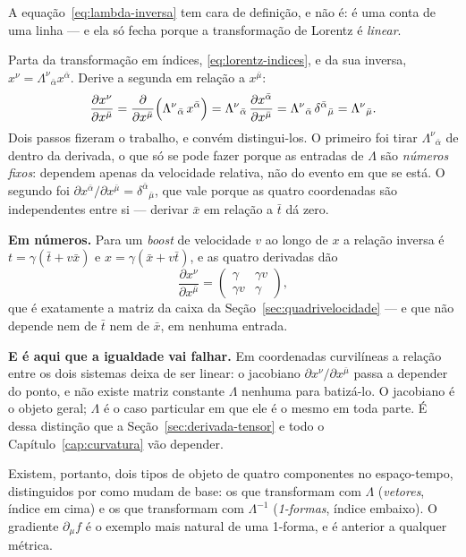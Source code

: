 \documentclass[12pt,a4paper,oneside]{book}
\theoremstyle{rgplain}
\theoremstyle{rgremark}
\begin{document}
\begin{resultado}[title={\sffamily\bfseries\footnotesize\color{rgAmbar}POR QUE O JACOBIANO É A MATRIZ DE LORENTZ}]
A equação~\eqref{eq:lambda-inversa} tem cara de definição, e não é: é uma conta
de uma linha --- e ela só fecha porque a transformação de Lorentz é
\emph{linear}.

Parta da transformação em índices, \eqref{eq:lorentz-indices}, e da sua
inversa, $x^\nu=\Lambda^{\nu}{}_{\bar\alpha}x^{\bar\alpha}$. Derive a segunda em
relação a $x^{\bar\mu}$:
\[
  \frac{\partial x^\nu}{\partial x^{\bar\mu}}
  =\frac{\partial}{\partial x^{\bar\mu}}
   \Bigl(\Lambda^{\nu}{}_{\bar\alpha}\,x^{\bar\alpha}\Bigr)
  =\Lambda^{\nu}{}_{\bar\alpha}\,\frac{\partial x^{\bar\alpha}}{\partial x^{\bar\mu}}
  =\Lambda^{\nu}{}_{\bar\alpha}\,\delta^{\bar\alpha}{}_{\bar\mu}
  =\Lambda^{\nu}{}_{\bar\mu} .
\]
Dois passos fizeram o trabalho, e convém distingui-los. O primeiro foi tirar
$\Lambda^{\nu}{}_{\bar\alpha}$ de dentro da derivada, o que só se pode fazer
porque as entradas de $\Lambda$ são \emph{números fixos}: dependem apenas da
velocidade relativa, não do evento em que se está. O segundo foi
$\partial x^{\bar\alpha}/\partial x^{\bar\mu}=\delta^{\bar\alpha}{}_{\bar\mu}$, que vale
porque as quatro coordenadas são independentes entre si --- derivar $\bar x$ em
relação a $\bar t$ dá zero.

\textbf{Em números.} Para um \emph{boost} de velocidade $v$ ao longo de $x$ a
relação inversa é $t=\gamma(\bar t+v\bar x)$ e $x=\gamma(\bar x+v\bar t)$, e as quatro
derivadas dão
\[
  \frac{\partial x^\nu}{\partial x^{\bar\mu}}
  =\begin{pmatrix}\gamma & \gamma v\\[2pt] \gamma v & \gamma\end{pmatrix},
\]
que é exatamente a matriz da caixa da Seção~\ref{sec:quadrivelocidade} --- e
que não depende nem de $\bar t$ nem de $\bar x$, em nenhuma entrada.

\textbf{E é aqui que a igualdade vai falhar.} Em coordenadas curvilíneas a
relação entre os dois sistemas deixa de ser linear: o jacobiano
$\partial x^\nu/\partial x^{\bar\mu}$ passa a depender do ponto, e não existe
matriz constante $\Lambda$ nenhuma para batizá-lo. O jacobiano é o objeto
geral; $\Lambda$ é o caso particular em que ele é o mesmo em toda parte. É dessa distinção que a Seção~\ref{sec:derivada-tensor} e todo o Capítulo~\ref{cap:curvatura} vão depender.
\end{resultado}

\begin{resultado}
Existem, portanto, dois tipos de objeto de quatro componentes no espaço-tempo,
distinguidos por como mudam de base: os que transformam com $\Lambda$
(\emph{vetores}, índice em cima) e os que transformam com $\Lambda^{-1}$
(\emph{1-formas}, índice embaixo). O gradiente $\partial_\mu f$ é o exemplo
mais natural de uma 1-forma, e é anterior a qualquer métrica.
\end{resultado}
\end{document}
